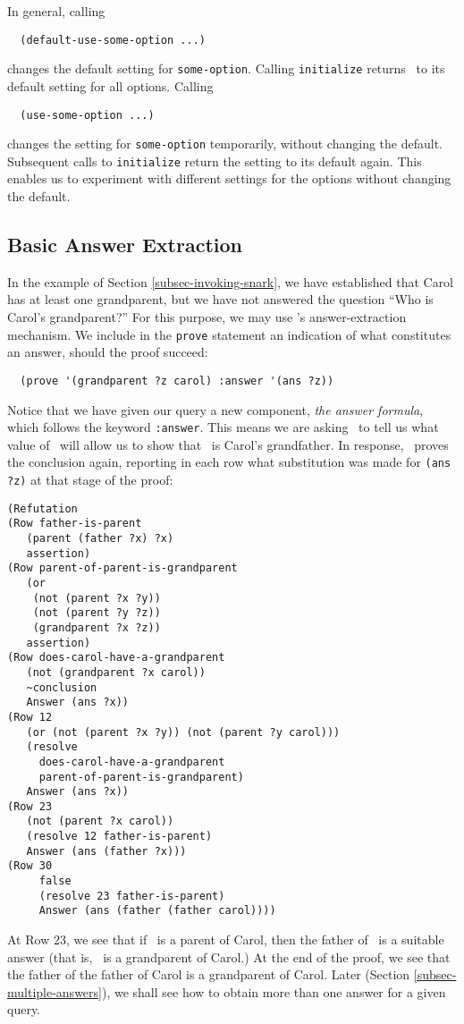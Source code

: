 In general, calling
\begin{verbatim}
  (default-use-some-option ...)
\end{verbatim}
changes the default setting for {\tt some-option}.  Calling {\tt initialize}
returns \snark\  to its default setting for all options.  Calling
\begin{verbatim}
  (use-some-option ...)
\end{verbatim}
changes the setting for {\tt some-option} temporarily, without changing the
default.  Subsequent calls to {\tt initialize} return the setting to
its default again.  This enables us to experiment with different
settings for the options without changing the default.

\subsection{Basic Answer Extraction}
\label{subsec-basic-answer-extraction}
In the example of Section \ref{subsec-invoking-snark}, we have
established that Carol has at least one grandparent, but we have not
answered the question ``Who is Carol's grandparent?''  For this
purpose, we may use \snark\/'s answer-extraction mechanism.  We
include in the {\tt prove} statement an indication of what constitutes
an answer, should the proof succeed:
\begin{verbatim}
  (prove '(grandparent ?z carol) :answer '(ans ?z))
\end{verbatim}
Notice that we have given our query a new component, {\em the answer
formula}, which follows the keyword {\tt :answer}.  This means we are asking
\snark\ to tell us what value of \varz\ will allow us to show that \varz\ is
Carol's grandfather.  In response, \snark\ proves the conclusion again,
reporting in each row what substitution was made for \verb'(ans ?z)' at that
stage of the proof:
\begin{verbatim}
(Refutation
(Row father-is-parent
   (parent (father ?x) ?x)
   assertion)
(Row parent-of-parent-is-grandparent
   (or
    (not (parent ?x ?y))
    (not (parent ?y ?z))
    (grandparent ?x ?z))
   assertion)
(Row does-carol-have-a-grandparent
   (not (grandparent ?x carol))
   ~conclusion
   Answer (ans ?x))
(Row 12
   (or (not (parent ?x ?y)) (not (parent ?y carol)))
   (resolve
     does-carol-have-a-grandparent
     parent-of-parent-is-grandparent)
   Answer (ans ?x))
(Row 23
   (not (parent ?x carol))
   (resolve 12 father-is-parent)
   Answer (ans (father ?x)))
(Row 30
     false
     (resolve 23 father-is-parent)
     Answer (ans (father (father carol))))
\end{verbatim}
At Row 23, we see that if \varx\  is a parent of Carol, then the father
of \varx\  is a suitable answer (that is, \varx\  is a grandparent of
Carol.)  At the end of the proof, we see that the father of the father
of Carol is a grandparent of Carol.  Later (Section
\ref{subsec-multiple-answers}), we shall see how to obtain more than
one answer for a given query.


